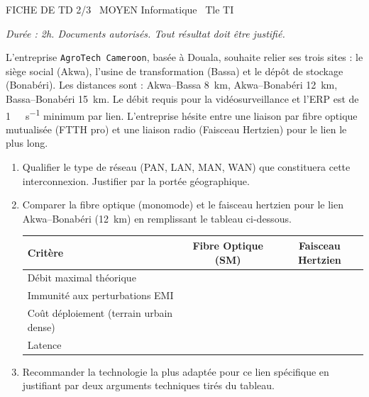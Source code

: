 \documentclass[11pt]{article}
\begin{document}
\begin{tcolorbox}[enhanced,colback=popink,colframe=popink,arc=10pt,boxrule=0pt,left=12pt,right=12pt,top=9pt,bottom=9pt]
{\color{white}\popxbold\small FICHE DE TD 2/3 \textbullet\ MOYEN \hfill Informatique \textbullet\ Tle TI\par}
\end{tcolorbox}
\vspace{4pt}
\noindent \textit{Durée : 2h. Documents autorisés. Tout résultat doit être justifié.}

\begin{exercice}
L'entreprise \texttt{AgroTech Cameroon}, basée à Douala, souhaite relier ses trois sites : le siège social (Akwa), l'usine de transformation (Bassa) et le dépôt de stockage (Bonabéri). Les distances sont : Akwa--Bassa \SI{8}{\kilo\metre}, Akwa--Bonabéri \SI{12}{\kilo\metre}, Bassa--Bonabéri \SI{15}{\kilo\metre}. Le débit requis pour la vidéosurveillance et l'ERP est de \SI{1}{\giga\bit\per\second} minimum par lien. L'entreprise hésite entre une liaison par fibre optique mutualisée (FTTH pro) et une liaison radio (Faisceau Hertzien) pour le lien le plus long.
\begin{enumerate}
    \item Qualifier le type de réseau (PAN, LAN, MAN, WAN) que constituera cette interconnexion. Justifier par la portée géographique.
    \item Comparer la fibre optique (monomode) et le faisceau hertzien pour le lien Akwa--Bonabéri (\SI{12}{\kilo\metre}) en remplissant le tableau ci-dessous.
    \begin{tabular}{|l|c|c|}
    \hline
    \textbf{Critère} & \textbf{Fibre Optique (SM)} & \textbf{Faisceau Hertzien} \\
    \hline
    Débit maximal théorique & & \\
    \hline
    Immunité aux perturbations EMI & & \\
    \hline
    Coût déploiement (terrain urbain dense) & & \\
    \hline
    Latence & & \\
    \hline
    \end{tabular}
    \item Recommander la technologie la plus adaptée pour ce lien spécifique en justifiant par deux arguments techniques tirés du tableau.
\end{enumerate}
\end{exercice}
\end{document}
